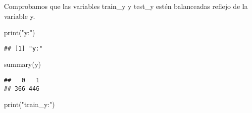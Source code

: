 \documentclass[
]{article}
\newenvironment{Shaded}{\begin{snugshade}}{\end{snugshade}}
\newcommand{\AttributeTok}[1]{\textcolor[rgb]{0.80,0.80,0.80}{#1}}
\newcommand{\CommentTok}[1]{\textcolor[rgb]{0.50,0.62,0.50}{#1}}
\newcommand{\DecValTok}[1]{\textcolor[rgb]{0.86,0.86,0.80}{#1}}
\newcommand{\FunctionTok}[1]{\textcolor[rgb]{0.94,0.94,0.56}{#1}}
\newcommand{\NormalTok}[1]{\textcolor[rgb]{0.80,0.80,0.80}{#1}}
\newcommand{\OtherTok}[1]{\textcolor[rgb]{0.94,0.94,0.56}{#1}}
\newcommand{\SpecialCharTok}[1]{\textcolor[rgb]{0.86,0.64,0.64}{#1}}
\newcommand{\StringTok}[1]{\textcolor[rgb]{0.80,0.58,0.58}{#1}}
\begin{document}
\begin{Shaded}
\end{Shaded}

Comprobamos que las variables train\_y y test\_y estén balanceadas
reflejo de la variable y.

\begin{Shaded}
\begin{Highlighting}[]
\FunctionTok{print}\NormalTok{(}\StringTok{"y:"}\NormalTok{)}
\end{Highlighting}
\end{Shaded}

\begin{verbatim}
## [1] "y:"
\end{verbatim}

\begin{Shaded}
\begin{Highlighting}[]
\FunctionTok{summary}\NormalTok{(y)}
\end{Highlighting}
\end{Shaded}

\begin{verbatim}
##   0   1 
## 366 446
\end{verbatim}

\begin{Shaded}
\begin{Highlighting}[]
\FunctionTok{print}\NormalTok{(}\StringTok{"train\_y:"}\NormalTok{)}
\end{Highlighting}
\end{Shaded}
\end{document}
